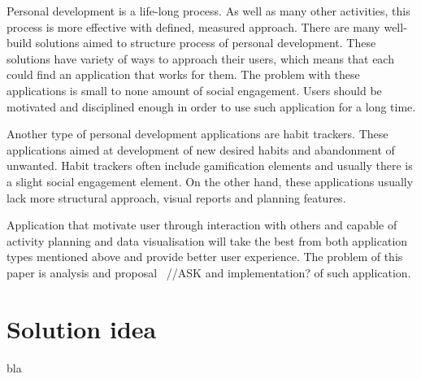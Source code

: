 Personal development is a life-long process.
As well as many other activities, this process is more effective with defined, measured approach.
There are many well-build solutions aimed to structure process of personal development.
These solutions have variety of ways to approach their users, which means that each could find an application that works for them.
The problem with these applications is small to none amount of social engagement.
Users should be motivated and disciplined enough in order to use such application for a long time.

Another type of personal development applications are habit trackers.
These applications aimed at development of new desired habits and abandonment of unwanted.
Habit trackers often include gamification elements and usually there is a slight social engagement element.
On the other hand, these applications usually lack more structural approach, visual reports and planning features.

Application that motivate user through interaction with others and capable of activity planning and data visualisation
will take the best from both application types mentioned above and provide better user experience.
The problem of this paper is analysis and proposal ~{\color{gray}//ASK and implementation?} of such application.

\section{Solution idea}\label{sec:solution-idea}

bla